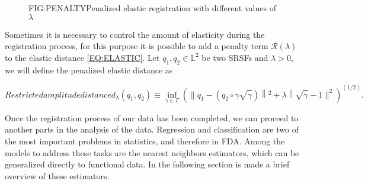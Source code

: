 
\begin{figure}[Penalized elastic registration]{FIG:PENALTY}{Penalized elastic registration with different values of $\lambda$}
	 \quad
\end{figure}

Sometimes it is necessary to control the amount of elasticity during the
registration process, for this purpose it is possible to add a penalty term
$\mathcal{R}(\lambda)$ to the elastic distance \ref{EQ:ELASTIC}.
Let $q_1, q_2 \in \mathbb{L}^2$ be two SRSFs and $\lambda > 0$, we will define
the penalized elastic distance as

\begin{equation}[]{Restricted amplitude distance}
d_{\lambda}\left(q_{1}, q_{2}\right) \equiv \inf _{\gamma \in \Gamma}\left(
\| q_{1}-\left(q_{2} \circ \gamma \sqrt{\dot{\gamma}}\right)\left\|^{2}+
\lambda\right\| \sqrt{\dot{\gamma}}-1 \|^{2} \right)^{(1 / 2)}.
\end{equation}

Once the registration process of our data has been completed,
we can proceed to another parts in the analysis of the data.
Regression and classification are two of the most important problems in
statistics, and therefore in \acs{FDA}.
Among the models to address these tasks are the nearest neighbors estimators,
which can be generalized directly to functional data. In the following section
is made a brief overview of these estimators.

